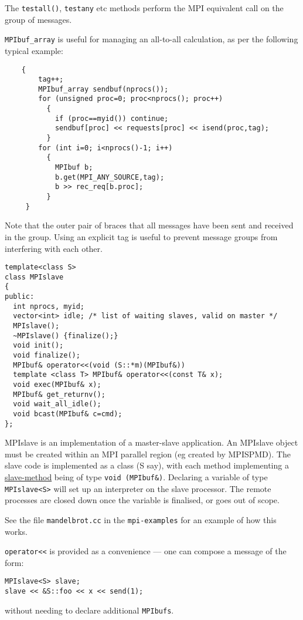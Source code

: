 The \verb+testall()+, \verb+testany+ etc methods perform the MPI
equivalent call on the group of messages.

\verb+MPIbuf_array+ is useful for managing an all-to-all calculation,
as per the following typical example:

\begin{verbatim}
    {
        tag++;
        MPIbuf_array sendbuf(nprocs());
        for (unsigned proc=0; proc<nprocs(); proc++)
          {
            if (proc==myid()) continue;
            sendbuf[proc] << requests[proc] << isend(proc,tag);
          }
        for (int i=0; i<nprocs()-1; i++)
          {
            MPIbuf b; 
            b.get(MPI_ANY_SOURCE,tag);
            b >> rec_req[b.proc];
          }
     }
\end{verbatim}

Note that the outer pair of braces that all messages have been sent
and received in the group. Using an explicit tag is useful to prevent
message groups from interfering with each other.


\begin{verbatim}
template<class S>
class MPIslave
{
public:
  int nprocs, myid;
  vector<int> idle; /* list of waiting slaves, valid on master */
  MPIslave();
  ~MPIslave() {finalize();}
  void init();
  void finalize();
  MPIbuf& operator<<(void (S::*m)(MPIbuf&))
  template <class T> MPIbuf& operator<<(const T& x);
  void exec(MPIbuf& x);
  MPIbuf& get_returnv();
  void wait_all_idle();
  void bcast(MPIbuf& c=cmd);
};
\end{verbatim}

MPIslave is an implementation of a master-slave application. An
MPIslave object must be created within an MPI parallel region (eg
created by MPISPMD). The slave
code is implemented as a class (S say), with each method
implementing a \hyperref{remote procedure}{(see \S}{)}{slave-method}
being of type \verb+void (MPIbuf&)+. Declaring a variable of type
\verb+MPIslave<S>+ will set up an interpreter on the slave processor. The remote processes
are closed down once the variable is finalised, or goes out of scope. 

See the file {\tt mandelbrot.cc} in the {\tt mpi-examples} for an
example of how this works.

\verb+operator<<+ is provided as a convenience --- one can compose a
message of the form:
\begin{verbatim}
MPIslave<S> slave;
slave << &S::foo << x << send(1);
\end{verbatim}
without needing to declare additional {\tt MPIbufs}.

